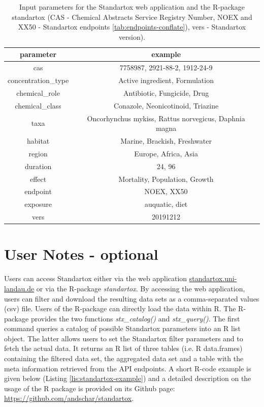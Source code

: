 \documentclass[journal,datadescriptor,accept,moreauthors,pdftex]{Definitions/mdpi}
\begin{document}
\begin{table}[H]
    \caption{Input parameters for the Standartox web application and the R-package standartox (CAS - Chemical Abstracts Service Registry Number, NOEX and XX50 - Standartox endpoints \ref{tab:endpoints-conflate}), vers - Standartox version).}
    \label{tab:app-parameters}
    \centering
    \begin{tabular}{cc}
    \toprule
    \textbf{parameter} & \textbf{example} \\ 
    \midrule
    cas & 7758987, 2921-88-2, 1912-24-9 \\
    concentration\_type & Active ingredient, Formulation \\
    chemical\_role & Antibiotic, Fungicide, Drug \\
    chemical\_class & Conazole, Neonicotinoid, Triazine \\
    taxa & Oncorhynchus mykiss, Rattus norvegicus, Daphnia magna \\
    habitat & Marine, Brackish, Freshwater \\
    region & Europe, Africa, Asia \\
    duration & 24, 96 \\
    effect & Mortality, Population, Growth \\
    endpoint & NOEX, XX50 \\
    exposure & auquatic, diet \\
    vers & 20191212 \\
    \bottomrule
\end{tabular}
\end{table}

\section{User Notes - optional}
Users can access Standartox either via the web application \url{standartox.uni-landau.de} or via the R-package \textit{standartox}. By accessing the web application, users can filter and download the resulting data sets as a comma-separated values (csv) file. Users of the R-package can directly load the data within R. The R-package provides the two functions \textit{stx\_catalog()} and \textit{stx\_query()}. The first command queries a catalog of possible Standartox parameters into an R list object. The latter allows users to set the Standartox filter parameters and to fetch the actual data. It returns an R list of three tables (i.e. R data.frames) containing the filtered data set, the aggregated data set and a table with the meta information retrieved from the API endpoints. A short R-code example is given below (Listing \ref{lis:standartox-example}) and a detailed description on the usage of the R package is provided on its Github page: \url{https://github.com/andschar/standartox}.
\end{document}
